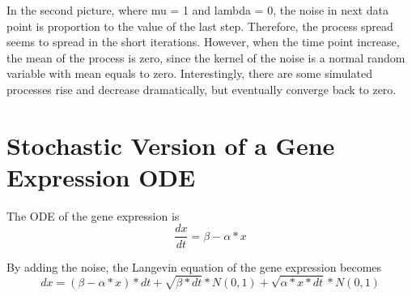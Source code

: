 \documentclass{article}
\begin{document}
    In the second picture, where mu = 1 and lambda = 0, the noise in next
data point is proportion to the value of the last step. Therefore, the
process spread seems to spread in the short iterations. However, when
the time point increase, the mean of the process is zero, since the
kernel of the noise is a normal random variable with mean equals to
zero. Interestingly, there are some simulated processes rise and
decrease dramatically, but eventually converge back to zero.

    \section{Stochastic Version of a Gene Expression
ODE}\label{stochastic-version-of-a-gene-expression-ode}

    The ODE of the gene expression is \[ \frac{dx}{dt} = \beta - \alpha*x \]

By adding the noise, the Langevin equation of the gene expression
becomes
\[ dx = (\beta - \alpha*x) * dt + \sqrt{\beta*dt} * N(0, 1) + \sqrt{\alpha*x*dt} * N(0, 1)\]
\end{document}
